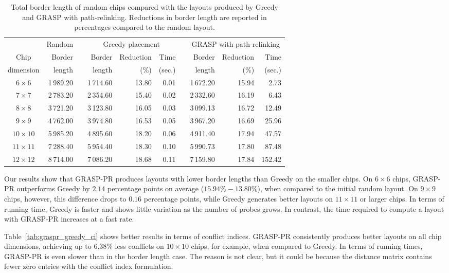 \begin{table}[t]\centering
\caption{\label{tab:graspr_greedy_bl}
  Total border length of random chips compared with the layouts produced by
  Greedy and GRASP with path-relinking. Reductions in border length are reported
  in percentages compared to the random layout.}
\small{
\begin{tabular*}{\hsize}{crcrrrcrrr}
          & Random & & \multicolumn{3}{c}{Greedy placement}  & & \multicolumn{3}{c}{GRASP with path-relinking}  \\ \cline{2-2} \cline{4-6} \cline{8-10}
Chip      & Border & & Border & Reduction & Time             & & Border & Reduction & Time   \\
dimension & length & & length & (\%)      & (sec.)           & & length & (\%)      & (sec.) \\
\hline
$6\times 6$   & 1\,989.20 & & 1\,714.60 & 13.80 & 0.01 & & 1\,672.20 & 15.94 &   2.73 \\
$7\times 7$   & 2\,783.20 & & 2\,354.60 & 15.40 & 0.02 & & 2\,332.60 & 16.19 &   6.43 \\
$8\times 8$   & 3\,721.20 & & 3\,123.80 & 16.05 & 0.03 & & 3\,099.13 & 16.72 &  12.49 \\
$9\times 9$   & 4\,762.00 & & 3\,974.80 & 16.53 & 0.05 & & 3\,967.20 & 16.69 &  25.96 \\
$10\times 10$ & 5\,985.20 & & 4\,895.60 & 18.20 & 0.06 & & 4\,911.40 & 17.94 &  47.57 \\
$11\times 11$ & 7\,288.40 & & 5\,954.40 & 18.30 & 0.10 & & 5\,990.73 & 17.80 &  87.48 \\
$12\times 12$ & 8\,714.00 & & 7\,086.20 & 18.68 & 0.11 & & 7\,159.80 & 17.84 & 152.42 \\
\hline
\end{tabular*}}
\end{table}

Our results show that GRASP-PR produces layouts with lower border lengths than
Greedy on the smaller chips. On $6\times 6$ chips, GRASP-PR outperforms Greedy
by $2.14$ percentage points on average ($15.94\% - 13.80\%$), when compared to
the initial random layout. On $9\times 9$ chips, however, this difference drops
to $0.16$ percentage points, while Greedy generates better layouts on
$11\times 11$ or larger chips. In terms of running time, Greedy is faster and
shows little variation as the number of probes grows. In contrast, the time
required to compute a layout with GRASP-PR increases at a fast rate.

Table~\ref{tab:graspr_greedy_ci} shows better results in terms of conflict
indices. GRASP-PR consistently produces better layouts on all chip dimensions,
achieving up to $6.38$\% less conflicts on $10\times 10$ chips, for example,
when compared to Greedy. In terms of running times, GRASP-PR is even slower than
in the border length case. The reason is not clear, but it could be because the
distance matrix contains fewer zero entries with the conflict index formulation.

